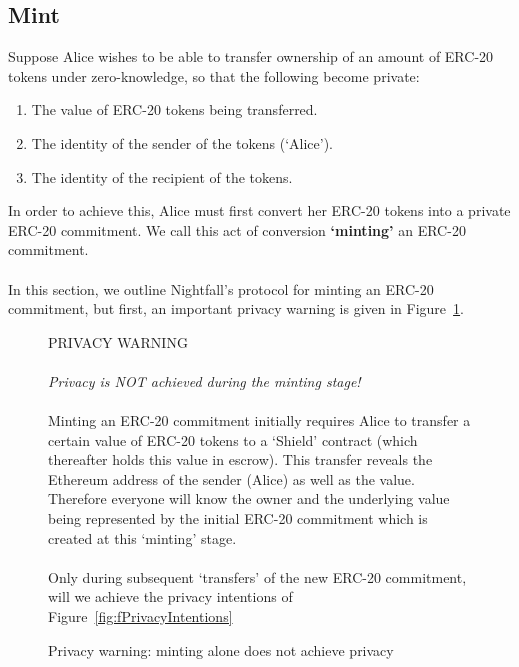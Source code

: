 \subsection{Mint}
\label{sec:20Mint}

Suppose Alice wishes to be able to transfer ownership of an amount of ERC-20 tokens under zero-knowledge, so that the following become private:
	\begin{center}
		\begin{framed}
      \begin{enumerate}
        \item The value of ERC-20 tokens being transferred.
        \item The identity of the sender of the tokens (`Alice').
        \item The identity of the recipient of the tokens.
      \end{enumerate}
    \end{framed}
  \end{center}
In order to achieve this, Alice must first convert her ERC-20 tokens into a private ERC-20 commitment. We call this act of conversion \textbf{`minting'} an ERC-20 commitment.\\
\\
In this section, we outline Nightfall's protocol for minting an ERC-20 commitment, but first, an important privacy warning is given in Figure~\ref{fig:fMintWarning}.

\begin{figure}[h]
  \begin{center}
    \begin{mdframed}[backgroundcolor=verylightred]
      \noindent
      PRIVACY WARNING\\
      \\
      \textit{
      Privacy is NOT achieved during the minting stage!
      }\\
      \\
      Minting an ERC-20 commitment initially requires Alice to transfer a certain value of ERC-20 tokens to a `Shield' contract (which thereafter holds this value in escrow). This transfer reveals the Ethereum address of the sender (Alice) as well as the value. Therefore everyone will know the owner and the underlying value being represented by the initial ERC-20 commitment which is created at this `minting' stage.\\
      \\
      Only during subsequent `transfers' of the new ERC-20 commitment, will we achieve the privacy intentions of Figure~\ref{fig:fPrivacyIntentions}
    \end{mdframed}
  \end{center}
  \caption{Privacy warning: minting alone does not achieve privacy}
  \label{fig:fMintWarning}
\end{figure}

